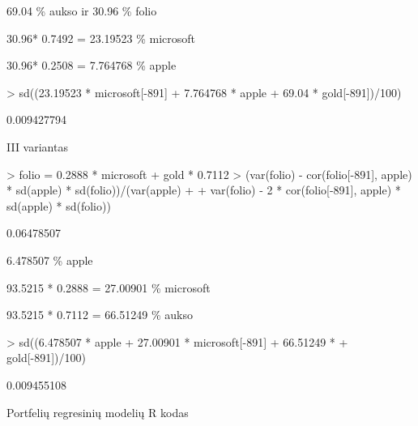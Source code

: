 \documentclass[12pt, a14paper, lithuanian]{article}
\begin{document}
69.04 \% aukso ir 30.96 \% folio

30.96* 0.7492 = 23.19523 \% microsoft

30.96* 0.2508 = 7.764768 \% apple
\begin{Schunk}
\begin{Sinput}
> sd((23.19523 * microsoft[-891] + 7.764768 * apple + 69.04 * gold[-891])/100)
\end{Sinput}
\begin{Soutput}
[1] 0.009427794
\end{Soutput}
\end{Schunk}

III variantas


\begin{Schunk}
\begin{Sinput}
> folio = 0.2888 * microsoft + gold * 0.7112
> (var(folio) - cor(folio[-891], apple) * sd(apple) * sd(folio))/(var(apple) + 
+     var(folio) - 2 * cor(folio[-891], apple) * sd(apple) * sd(folio))
\end{Sinput}
\begin{Soutput}
[1] 0.06478507
\end{Soutput}
\end{Schunk}


6.478507 \% apple

93.5215 * 0.2888 = 27.00901 \% microsoft

93.5215 * 0.7112 = 66.51249 \% aukso

\begin{Schunk}
\begin{Sinput}
> sd((6.478507 * apple + 27.00901 * microsoft[-891] + 66.51249 * 
+     gold[-891])/100)
\end{Sinput}
\begin{Soutput}
[1] 0.009455108
\end{Soutput}
\end{Schunk}

 Portfelių regresinių modelių R kodas
\end{document}
